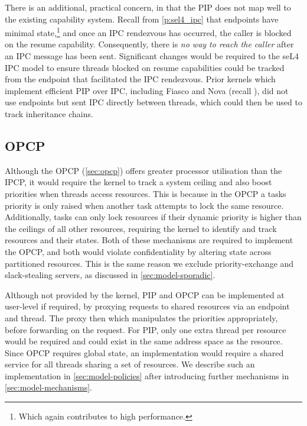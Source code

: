 There is an additional, practical concern, in that the \gls{PIP} does not map well to the existing
capability system. Recall from \cref{p:sel4_ipc} that endpoints have minimal state,\footnote{Which
again contributes to high performance.} and once an \gls{IPC} rendezvous has occurred, the caller is
blocked on the resume capability. Consequently, there is \emph{no way to reach the caller} after an 
\gls{IPC} message has been sent. 
Significant changes would be required to the seL4 \gls{IPC} model to ensure threads
blocked on resume capabilities could be tracked from the endpoint that facilitated the IPC
rendezvous. Prior kernels which implement efficient \gls{PIP} over \gls{IPC}, including Fiasco and Nova (recall
), did not use endpoints but sent \gls{IPC} directly between threads, which could
then be used to track inheritance chains.

\subsection{\gls{OPCP}}

Although the \gls{OPCP} (\cref{sec:opcp}) offers greater processor utilisation than the \gls{IPCP}, it would require the
kernel to track a system ceiling and also boost priorities when threads access resources. This is
because in the \gls{OPCP} a tasks priority is only raised when another task attempts to lock the
same resource. Additionally, tasks can only lock resources if their dynamic priority is higher than
the ceilings of all other resources, requiring the kernel to identify and track resources and their
states. Both of these mechanisms are
required to implement the \gls{OPCP}, and both would violate confidentiality by altering state 
across partitioned resources.  This is the same reason we exclude
priority-exchange and slack-stealing servers, as discussed in \cref{sec:model-sporadic}.

Although not provided by the kernel, \gls{PIP} and \gls{OPCP} can be implemented at user-level if
required, by proxying requests to shared resources via an endpoint and thread. The proxy then which manipulates the priorities
appropriately, before forwarding on the request. For \gls{PIP}, only one extra thread per resource would 
be required and could exist in the same address space as the resource.
Since \gls{OPCP} requires global state, an implementation would require a shared service for all threads 
sharing a set of resources. We describe such an implementation in \cref{sec:model-policies} after introducing further mechanisms
in \cref{sec:model-mechanisms}.

